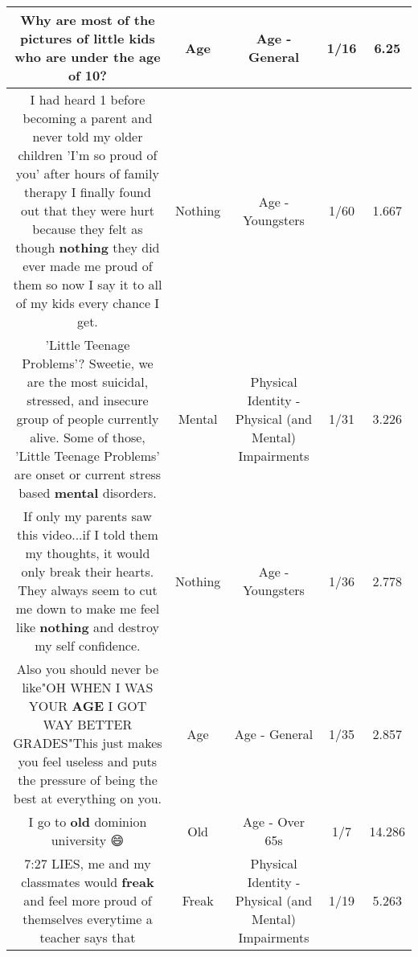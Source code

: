 \documentclass[11pt]{article}
\newlength\mylength
\begin{document}
\begin{center}
\begin{longtable}{|C{.65\mylength}|C{.30\mylength}|C{.12\mylength}|C{.12\mylength}|C{.12\mylength}|}
  \small Why are most of the pictures of little kids who are under the \textbf{age} of 10?\normalsize   & Age & Age - General & 1/16 & 6.25 \\  \hline
  \small I had heard 1 before becoming a parent and never told my older children 'I'm so proud of you' after hours of family therapy I finally found out that they were hurt because they felt as though \textbf{nothing} they did ever made me proud of them so now I say it to all of my kids every chance I get.\normalsize   & Nothing & Age - Youngsters & 1/60 & 1.667 \\  \hline
  \small 'Little Teenage Problems'? Sweetie, we are the most suicidal, stressed, and insecure group of people currently alive. Some of those, 'Little Teenage Problems' are onset or current stress based \textbf{mental} disorders.\normalsize   & Mental & Physical Identity - Physical (and Mental) Impairments & 1/31 & 3.226 \\  \hline
  \small If only my parents saw this video...if I told them my thoughts, it would only break their hearts. They always seem to cut me down to make me feel like \textbf{nothing} and destroy my self confidence.\normalsize   & Nothing & Age - Youngsters & 1/36 & 2.778 \\  \hline
  \small Also you should never be like"OH WHEN I WAS YOUR \textbf{AGE} I GOT WAY BETTER GRADES"This just makes you feel useless and puts the pressure of being the best at everything on you.\normalsize   & Age & Age - General & 1/35 & 2.857 \\  \hline
  \small I go to \textbf{old} dominion university 😄\normalsize   & Old & Age - Over 65s & 1/7 & 14.286 \\  \hline
  \small 7:27 LIES, me and my classmates would \textbf{freak} and feel more proud of themselves everytime a teacher says that\normalsize   & Freak & Physical Identity - Physical (and Mental) Impairments & 1/19 & 5.263 \\  \hline

\end{longtable}
\end{center}
\end{document}

